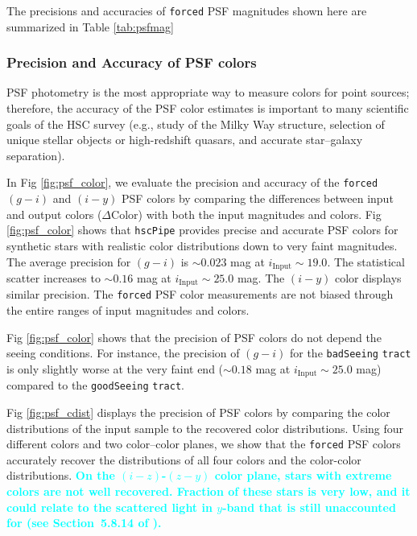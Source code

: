 \documentclass[useamsfonts]{pasj01}
\def\hscpipe{\texttt{hscPipe}}
\def\forced{\texttt{forced}}
\def\tract{\texttt{tract}}
\newcommand{\song}[1]{\textcolor{cyan} {\textbf{#1}}}
\begin{document}
	The precisions and accuracies of \forced{} PSF magnitudes shown here are 
	summarized in Table \ref{tab:psfmag}

\subsubsection{Precision and Accuracy of PSF colors}

    PSF photometry is the most appropriate way to measure colors for point
    sources; therefore, the accuracy of the PSF color estimates is important to many 
    scientific goals of the HSC survey
    (e.g., study of the Milky Way structure, selection of unique stellar objects or
    high-redshift quasars, and accurate star--galaxy separation).

    In Fig \ref{fig:psf_color}, we evaluate the precision and accuracy of the 
    \forced{} $(g-i)$ and $(i-y)$ PSF colors by comparing the differences between input 
    and output colors ($\Delta \mathrm{Color}$) with both the input magnitudes and 
    colors. 
    Fig \ref{fig:psf_color} shows that \hscpipe{} provides precise and accurate PSF 
    colors for synthetic stars with realistic color distributions down to very 
    faint magnitudes. 
    The average precision for $(g-i)$ is ${\sim}0.023$ mag at 
    $i_{\mathrm{Input}}{\sim}19.0$. 
    The statistical scatter increases to ${\sim}0.16$ mag at 
    $i_{\mathrm{Input}}{\sim}25.0$ mag.  
    The $(i-y)$ color displays similar precision. 
    The \forced{} PSF color measurements are not biased through the entire ranges of 
    input magnitudes and colors.
    
    Fig \ref{fig:psf_color} shows that the precision of PSF colors do not depend 
    the seeing conditions. 
    For instance, the precision of $(g-i)$ for the \texttt{badSeeing} \tract{} is 
    only slightly worse at the very faint end (${\sim}0.18$ mag at
    $i_{\mathrm{Input}}{\sim}25.0$ mag) compared to the \texttt{goodSeeing} \tract{}.

    Fig \ref{fig:psf_cdist} displays the precision of PSF colors by comparing the 
    color distributions of the input sample to the recovered color distributions. 
    Using four different colors and two color--color planes, we show that the 
    \forced{} PSF colors accurately recover the distributions of all four colors 
    and the color-color distributions.
    \song{
    On the $(i-z)$-$(z-y)$ color plane, stars with extreme colors are not well 
    recovered.  
    Fraction of these stars is very low, and it could relate to the scattered 
    light in $y$-band that is still unaccounted for (see Section~5.8.14 of 
    \citealt{HSCDR1}). 
    }
\end{document}

